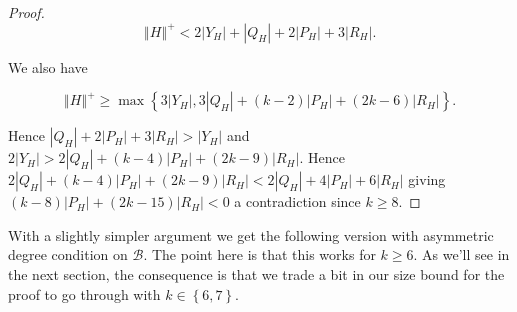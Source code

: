 \documentclass[12pt]{article}
\theoremstyle{plain}
\theoremstyle{definition}
\theoremstyle{remark}
\newcommand{\fancy}[1]{\mathcal{#1}}
\newcommand{\B}{\fancy{B}}
\newcommand{\set}[1]{\left\{ #1 \right\}}
\newcommand{\card}[1]{\left|#1\right|}
\newcommand{\size}[1]{\left\Vert#1\right\Vert}
\begin{document}
\begin{proof}
\[\size{H}^+ < 2\card{Y_H} + \card{Q_H} + 2\card{P_H} + 3\card{R_H}.\] 

\noindent We also have 

\[\size{H}^+ \geq \max\set{3\card{Y_H}, 3\card{Q_H} + (k-2)\card{P_H} + (2k-6)\card{R_H}}.\]

\noindent Hence $\card{Q_H} + 2\card{P_H} + 3\card{R_H} > \card{Y_H}$ and $2\card{Y_H} > 2\card{Q_H} + (k-4)\card{P_H} + (2k-9)\card{R_H}$.  Hence $2\card{Q_H} + (k-4)\card{P_H} + (2k-9)\card{R_H} < 2\card{Q_H} + 4\card{P_H} + 6\card{R_H}$ giving $(k-8)\card{P_H} + (2k-15)\card{R_H} < 0$ a contradiction since $k \geq 8$.
\end{proof}

With a slightly simpler argument we get the following version with asymmetric degree condition on $\B$.  The point here is that this works for $k \geq 6$.  As we'll see in the next section, the consequence is that we trade a bit in our size bound for the proof to go through with $k \in \set{6,7}$.
\end{document}
